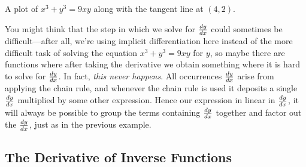 \begin{marginfigure}[-3in]
\caption{A plot of $x^3+y^3 = 9xy$ along with the tangent line at
  $(4,2)$.}
\label{plot:x^3+y^3=9xy}
\end{marginfigure}

\break

You might think that the step in which we solve for $\frac{dy}{dx}$ could
sometimes be difficult---after all, we're using implicit
differentiation here instead of the more difficult task of solving the
equation $x^3+y^3=9xy$ for $y$, so maybe there are functions where
after taking the derivative we obtain something where it is hard to
solve for $\frac{dy}{dx}$. In fact, \textit{this never happens}. All
occurrences $\frac{dy}{dx}$ arise from applying the chain rule, and whenever
the chain rule is used it deposits a single $\frac{dy}{dx}$ multiplied by some
other expression. Hence our expression in linear in $\frac{dy}{dx}$, it will
always be possible to group the terms containing $\frac{dy}{dx}$ together and
factor out the $\frac{dy}{dx}$, just as in the previous example. 




\subsection*{The Derivative of Inverse Functions}


